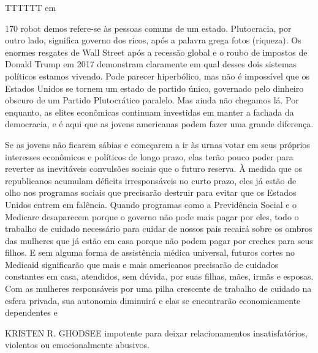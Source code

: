  \par 
TTTTTT em
 \par 
170 robot demos refere-se às pessoas comuns de um estado. Plutocracia, por outro lado, significa governo dos ricos, após a palavra grega fotos (riqueza). Os enormes resgates de Wall Street após a recessão global e o roubo de impostos de Donald Trump em 2017 demonstram claramente em qual desses dois sistemas políticos estamos vivendo. Pode parecer hiperbólico, mas não é impossível que os Estados Unidos se tornem um estado de partido único, governado pelo dinheiro obscuro de um Partido Plutocrático paralelo. Mas ainda não chegamos lá. Por enquanto, as elites econômicas continuam investidas em manter a fachada da democracia, e é aqui que as jovens americanas podem fazer uma grande diferença.
 \par 
Se as jovens não ficarem sábias e começarem a ir às urnas votar em seus próprios interesses econômicos e políticos de longo prazo, elas terão pouco poder para reverter as inevitáveis ​​convulsões sociais que o futuro reserva. À medida que os republicanos acumulam déficits irresponsáveis ​​no curto prazo, eles já estão de olho nos programas sociais que precisarão destruir para evitar que os Estados Unidos entrem em falência. Quando programas como a Previdência Social e o Medicare desaparecem porque o governo não pode mais pagar por eles, todo o trabalho de cuidado necessário para cuidar de nossos pais recairá sobre os ombros das mulheres que já estão em casa porque não podem pagar por creches para seus filhos. E sem alguma forma de assistência médica universal, futuros cortes no Medicaid significarão que mais e mais americanos precisarão de cuidados constantes em casa, atendidos, sem dúvida, por suas filhas, mães, irmãs e esposas. Com as mulheres responsáveis ​​por uma pilha crescente de trabalho de cuidado na esfera privada, sua autonomia diminuirá e elas se encontrarão economicamente dependentes e
 \par 
KRISTEN R. GHODSEE impotente para deixar relacionamentos insatisfatórios, violentos ou emocionalmente abusivos.
 \par 

